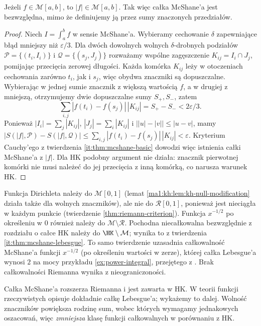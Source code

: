 \begin{twierdzenie}\label{it:thm:mcshane-absolute}
Jeżeli $f\in\mathcal M[a,b]$, to $|f|\in\mathcal M[a,b]$. Tak więc całka McShane'a jest bezwzględna, mimo że definiujemy ją przez sumy znaczonych przedziałów.
\end{twierdzenie}
\begin{proof}
Niech $I=\int_a^b f$ w sensie McShane'a. Wybieramy cechowanie $\delta$ zapewniające błąd mniejszy niż $\varepsilon/3$. Dla dwóch dowolnych wolnych $\delta$-drobnych podziałów $\mathcal P=\{(t_i,I_i)\}$ i $\mathcal Q=\{(s_j,J_j)\}$ rozważamy wspólne zagęszczenie $K_{ij}=I_i\cap J_j$, pomijając przecięcia zerowej długości. Każda komórka $K_{ij}$ leży w otoczeniach cechowania zarówno $t_i$, jak i $s_j$, więc obydwa znaczniki są dopuszczalne. Wybierając w jednej sumie znacznik z większą wartością $f$, a w drugiej z mniejszą, otrzymujemy dwie dopuszczalne sumy $S_+,S_-$, zatem
\[
\sum_{i,j}|f(t_i)-f(s_j)|\,|K_{ij}|=S_+-S_-<2\varepsilon/3.
\]
Ponieważ $|I_i|=\sum_j|K_{ij}|$, $|J_j|=\sum_i|K_{ij}|$ i $\bigl||u|-|v|\bigr|\le|u-v|$, mamy
$|S(|f|,\mathcal P)-S(|f|,\mathcal Q)|\le\sum_{i,j}|f(t_i)-f(s_j)|\,|K_{ij}|<\varepsilon$.
Kryterium Cauchy'ego z twierdzenia \ref{it:thm:mcshane-basic} dowodzi więc istnienia całki McShane'a z $|f|$. Dla HK podobny argument nie działa: znacznik pierwotnej komórki nie musi należeć do jej przecięcia z inną komórką, co narusza warunek HK.
\end{proof}

\begin{przyklad}
Funkcja Dirichleta należy do $\mathcal M[0,1]$ (lemat \ref{ma1:kh:lem:kh-null-modification} działa także dla wolnych znaczników), ale nie do $\mathcal R[0,1]$, ponieważ jest nieciągła w każdym punkcie (twierdzenie \ref{thm:riemann-criterion}). Funkcja $x^{-1/2}$ po określeniu w $0$ również należy do $\mathcal M\setminus\mathcal R$. Pochodna niecałkowalna bezwzględnie z rozdziału o całce HK należy do $\HK\setminus\mathcal M$; wynika to z twierdzenia \ref{it:thm:mcshane-lebesgue}. To samo twierdzenie uzasadnia całkowalność McShane'a funkcji $x^{-1/2}$ (po określeniu wartości w zerze), której całka Lebesgue'a wynosi $2$ na mocy przykładu \ref{ex:power-integral}, przejętego z . Brak całkowalności Riemanna wynika z nieograniczoności.
\end{przyklad}

\begin{uwaga}
Całka McShane'a rozszerza Riemanna i jest zawarta w HK. W teorii funkcji rzeczywistych opisuje dokładnie całkę Lebesgue'a; wykażemy to dalej. Wolność znaczników powiększa rodzinę sum, wobec których wymagamy jednakowych oszacowań, więc \emph{zmniejsza} klasę funkcji całkowalnych w porównaniu z HK.
\end{uwaga}

